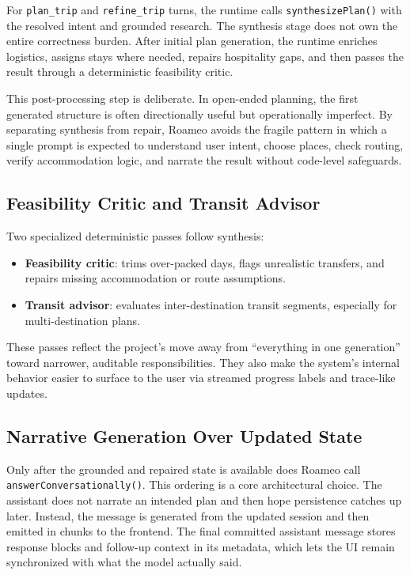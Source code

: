 \documentclass[conference]{IEEEtran}
\begin{document}
For \texttt{plan\_trip} and \texttt{refine\_trip} turns, the runtime calls \texttt{synthesizePlan()} with the resolved intent and grounded research. The synthesis stage does not own the entire correctness burden. After initial plan generation, the runtime enriches logistics, assigns stays where needed, repairs hospitality gaps, and then passes the result through a deterministic feasibility critic.

This post-processing step is deliberate. In open-ended planning, the first generated structure is often directionally useful but operationally imperfect. By separating synthesis from repair, Roameo avoids the fragile pattern in which a single prompt is expected to understand user intent, choose places, check routing, verify accommodation logic, and narrate the result without code-level safeguards.

\subsection{Feasibility Critic and Transit Advisor}

Two specialized deterministic passes follow synthesis:

\begin{itemize}
  \item \textbf{Feasibility critic}: trims over-packed days, flags unrealistic transfers, and repairs missing accommodation or route assumptions.
  \item \textbf{Transit advisor}: evaluates inter-destination transit segments, especially for multi-destination plans.
\end{itemize}

These passes reflect the project's move away from ``everything in one generation'' toward narrower, auditable responsibilities. They also make the system's internal behavior easier to surface to the user via streamed progress labels and trace-like updates.

\subsection{Narrative Generation Over Updated State}

Only after the grounded and repaired state is available does Roameo call \texttt{answerConversationally()}. This ordering is a core architectural choice. The assistant does not narrate an intended plan and then hope persistence catches up later. Instead, the message is generated from the updated session and then emitted in chunks to the frontend. The final committed assistant message stores response blocks and follow-up context in its metadata, which lets the UI remain synchronized with what the model actually said.
\end{document}

